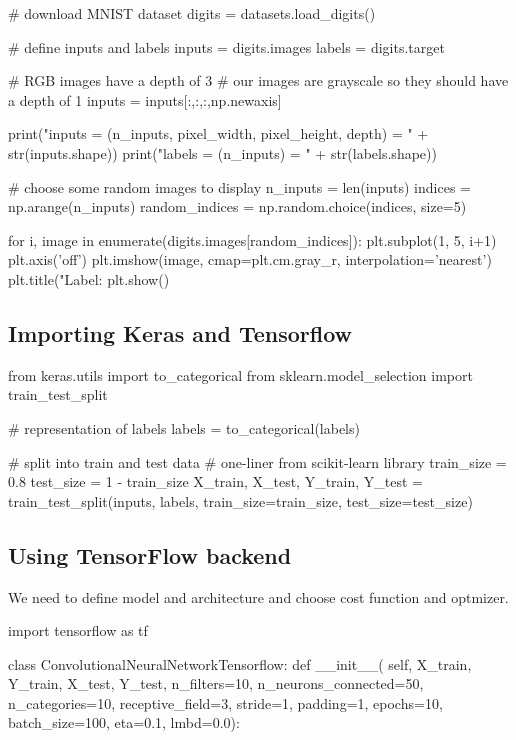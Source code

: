 \documentclass[%
oneside,                 %
final,                   %
10pt]{article}
\begin{document}
# download MNIST dataset
digits = datasets.load_digits()

# define inputs and labels
inputs = digits.images
labels = digits.target

# RGB images have a depth of 3
# our images are grayscale so they should have a depth of 1
inputs = inputs[:,:,:,np.newaxis]

print("inputs = (n_inputs, pixel_width, pixel_height, depth) = " + str(inputs.shape))
print("labels = (n_inputs) = " + str(labels.shape))


# choose some random images to display
n_inputs = len(inputs)
indices = np.arange(n_inputs)
random_indices = np.random.choice(indices, size=5)

for i, image in enumerate(digits.images[random_indices]):
    plt.subplot(1, 5, i+1)
    plt.axis('off')
    plt.imshow(image, cmap=plt.cm.gray_r, interpolation='nearest')
    plt.title("Label: %
plt.show()
\epycod


\subsection{Importing Keras and Tensorflow}
\bpycod
from keras.utils import to_categorical
from sklearn.model_selection import train_test_split

# representation of labels
labels = to_categorical(labels)

# split into train and test data
# one-liner from scikit-learn library
train_size = 0.8
test_size = 1 - train_size
X_train, X_test, Y_train, Y_test = train_test_split(inputs, labels, train_size=train_size,
                                                    test_size=test_size)
\epycod

\subsection{Using TensorFlow backend}

We need to define model and architecture and choose cost function and optmizer.
\bpycid

import tensorflow as tf

class ConvolutionalNeuralNetworkTensorflow:
    def __init__(
            self,
            X_train,
            Y_train,
            X_test,
            Y_test,
            n_filters=10,
            n_neurons_connected=50,
            n_categories=10,
            receptive_field=3,
            stride=1,
            padding=1,
            epochs=10,
            batch_size=100,
            eta=0.1,
            lmbd=0.0):
        
\end{document}
